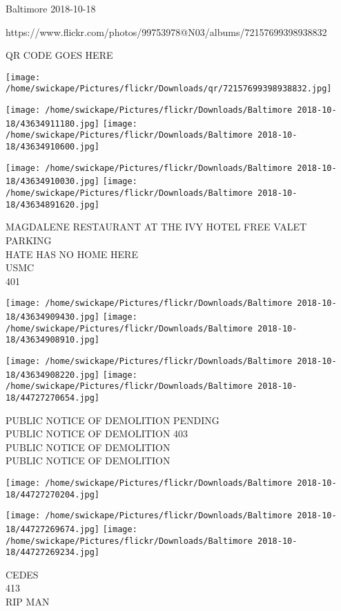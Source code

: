 \documentclass[10pt,letterpaper]{article}
\begin{document}
Baltimore 2018-10-18

https://www.flickr.com/photos/99753978@N03/albums/72157699398938832

QR CODE GOES HERE

\texttt{[image: /home/swickape/Pictures/flickr/Downloads/qr/72157699398938832.jpg]}
\pagebreak

\texttt{[image: /home/swickape/Pictures/flickr/Downloads/Baltimore 2018-10-18/43634911180.jpg]}
\texttt{[image: /home/swickape/Pictures/flickr/Downloads/Baltimore 2018-10-18/43634910600.jpg]}

\texttt{[image: /home/swickape/Pictures/flickr/Downloads/Baltimore 2018-10-18/43634910030.jpg]}
\texttt{[image: /home/swickape/Pictures/flickr/Downloads/Baltimore 2018-10-18/43634891620.jpg]}

MAGDALENE RESTAURANT AT THE IVY HOTEL FREE VALET PARKING\\
HATE HAS NO HOME HERE\\
USMC\\
401\\
\pagebreak

\texttt{[image: /home/swickape/Pictures/flickr/Downloads/Baltimore 2018-10-18/43634909430.jpg]}
\texttt{[image: /home/swickape/Pictures/flickr/Downloads/Baltimore 2018-10-18/43634908910.jpg]}

\texttt{[image: /home/swickape/Pictures/flickr/Downloads/Baltimore 2018-10-18/43634908220.jpg]}
\texttt{[image: /home/swickape/Pictures/flickr/Downloads/Baltimore 2018-10-18/44727270654.jpg]}

PUBLIC NOTICE OF DEMOLITION PENDING\\
PUBLIC NOTICE OF DEMOLITION 403\\
PUBLIC NOTICE OF DEMOLITION\\
PUBLIC NOTICE OF DEMOLITION\\
\pagebreak

\texttt{[image: /home/swickape/Pictures/flickr/Downloads/Baltimore 2018-10-18/44727270204.jpg]}

\vspace{0.25in}
\texttt{[image: /home/swickape/Pictures/flickr/Downloads/Baltimore 2018-10-18/44727269674.jpg]}
\texttt{[image: /home/swickape/Pictures/flickr/Downloads/Baltimore 2018-10-18/44727269234.jpg]}

CEDES\\
413\\
RIP MAN\\
\pagebreak
\end{document}
